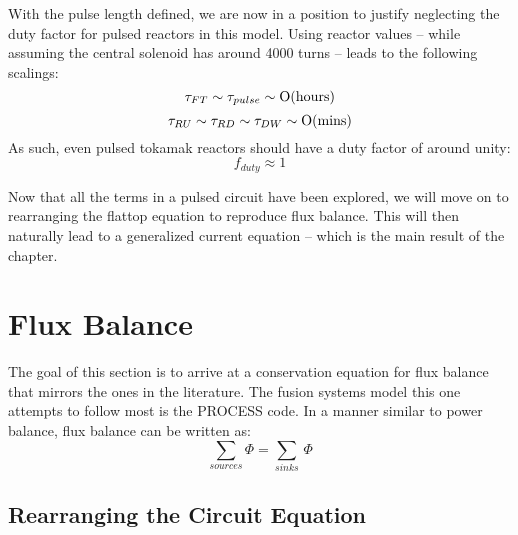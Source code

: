 With the pulse length defined, we are now in a position to justify neglecting the duty factor for pulsed reactors in this model. Using  reactor values -- while assuming the central solenoid has around 4000 turns -- leads to the following scalings:
\begin{equation}
	\tau_{FT} \sim \tau_{pulse} \sim \textnormal{O(hours)}
\end{equation}
\begin{equation}
	\tau_{RU} \sim \tau_{RD} \sim \tau_{DW} \sim \textnormal{O(mins)}
\end{equation}
As such, even pulsed tokamak reactors should have a duty factor of around unity:
\begin{equation}
	f_{duty} \approx 1
\end{equation}

Now that all the terms in a pulsed circuit have been explored, we will move on to rearranging the flattop equation to reproduce flux balance. This will then naturally lead to a generalized current equation -- which is the main result of the chapter.

\section{ Flux Balance}

The goal of this section is to arrive at a conservation equation for flux balance that mirrors the ones in the literature. The fusion systems model this one attempts to follow most is the PROCESS code.\cite{process} In a manner similar to power balance, flux balance can be written as:
\begin{equation}
	\sum_{sources} \Phi = \sum_{sinks} \, \Phi
\end{equation}

\subsection{Rearranging the Circuit Equation}


